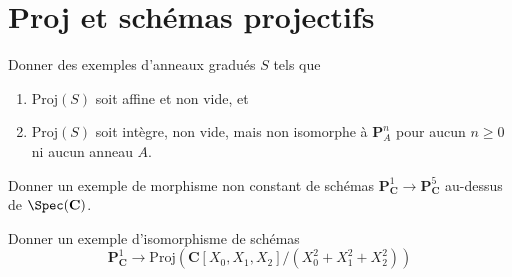 \section{Proj et schémas projectifs}
\label{section-proj}

\begin{exercise}
\label{exercise-graded-ring-specified-result}
Donner des exemples d'anneaux gradués $S$ tels que
\begin{enumerate}
\item $\text{Proj}(S)$ soit affine et non vide, et
\item $\text{Proj}(S)$ soit intègre, non vide, mais non isomorphe
à ${\mathbf P}^n_A$ pour aucun $n\geq 0$ ni aucun anneau $A$.
\end{enumerate}
\end{exercise}

\begin{exercise}
\label{exercise-nonconstant-morphism-proj}
Donner un exemple de morphisme non constant
de schémas ${\mathbf P}^1_{\mathbf C} \to {\mathbf P}^5_{\mathbf C}$ au-dessus de
$\Spec({\mathbf C})$.
\end{exercise}

\begin{exercise}
\label{exercise-isomorphism-P1-conic}
Donner un exemple d'isomorphisme de schémas
$$
{\mathbf P}^1_{\mathbf C} \to
\text{Proj}({\mathbf C}[X_0, X_1, X_2]/(X_0^2 + X_1^2 + X_2^2))
$$
\end{exercise}

